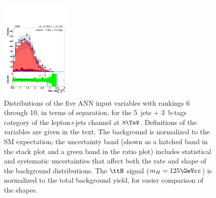 \begin{figure}[hbtp]
\begin{center}
   \includegraphics[width=0.31\textwidth]{Figures/Analysis_1_Diagrams/d2MCPlots_min_dr_tagged_jets_cut5_j5_t3_Combined_HtWgt.pdf}
   \hspace{0.055\textwidth}
   \caption{Distributions of the five ANN input variables with
     rankings 6 through 10, in terms of separation, for the 5~jets +
     3~b-tags category of the lepton+jets channel at $8
     \TeV$. Definitions of the variables are given in the text. The
     background is normalized to the SM expectation; the
     uncertainty band (shown as a hatched band in the stack plot and a
     green band in the ratio plot) includes statistical and systematic
     uncertainties that affect both the rate and shape of the
     background distributions.  The $\ttH$ signal ($m_{H} =
     125 \GeVcc$) is normalized to the total background yield, for
     easier comparison of the
     shapes.}  \label{fig:lj_input_5j_3t_part2} \end{center} 
\end{figure}


%
%

\clearpage

